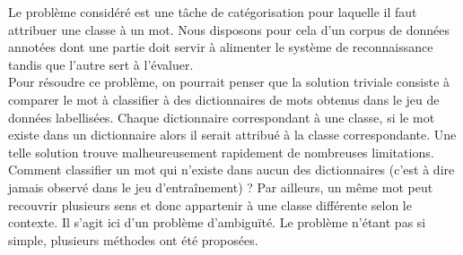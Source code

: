 Le problème considéré est une tâche de catégorisation pour laquelle il faut attribuer une classe à un mot. Nous disposons pour cela d'un corpus de données annotées dont une partie doit servir à alimenter le système de reconnaissance tandis que l'autre sert à l'évaluer.\\
Pour résoudre ce problème, on pourrait penser que la solution triviale consiste à comparer le mot à classifier à des dictionnaires de mots obtenus dans le jeu de données labellisées. Chaque dictionnaire correspondant à une classe, si le mot existe dans un dictionnaire alors il serait attribué à la classe correspondante. Une telle solution trouve malheureusement rapidement de nombreuses limitations. Comment classifier un mot qui n'existe dans aucun des dictionnaires (c'est à dire jamais observé dans le jeu d’entraînement) ? Par ailleurs, un même mot peut recouvrir plusieurs sens et donc appartenir à une classe différente selon le contexte. Il s'agit ici d'un problème d'ambiguïté. Le problème n'étant pas si simple, plusieurs méthodes ont été proposées.